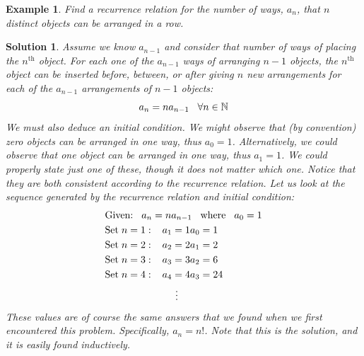 \documentclass[12pt, letterpaper, onecolumn, conference, final]{IEEEtran}
\theoremstyle{definition}
\theoremstyle{plain}
\newtheorem{example}{Example}[section]
\newtheorem{solution}{Solution}[section]
\begin{document}
\begin{example}
Find a recurrence relation for the number of ways, $a_n$, that $n$ distinct objects can be arranged in a row.
\end{example}

\newpage
\begin{solution}
Assume we know $a_{n-1}$ and consider that number of ways of placing the $n^\text{th}$ object. For each one of the $a_{n-1}$ ways of arranging $n-1$ objects, the $n^\text{th}$ object can be inserted before, between, or after giving $n$ new arrangements for each of the $a_{n-1}$ arrangements of $n-1$ objects:
\begin{equation*}
a_n = na_{n-1} \hspace{.3cm} \forall n \in \mathbb{N}
\end{equation*}
We must also deduce an initial condition. We might observe that (by convention) zero objects can be arranged in one way, thus $a_0=1$. Alternatively, we could observe that one object can be arranged in one way, thus $a_1=1$. We could properly state just one of these, though it does not matter which one. Notice that they are both consistent according to the recurrence relation. Let us look at the sequence generated by the recurrence relation and initial condition:
\begin{equation*}
\begin{split}
&\text{Given:} \hspace{.3cm} a_n = na_{n-1} \hspace{.3cm} \text{where} \hspace{.3cm} a_0 = 1 \\
&\text{Set} \hspace{.1cm} n = 1: \hspace{.3cm} a_1 = 1a_0 = 1 \\
&\text{Set} \hspace{.1cm} n = 2: \hspace{.3cm} a_2 = 2a_1 = 2 \\
&\text{Set} \hspace{.1cm} n = 3: \hspace{.3cm} a_3 = 3a_2 = 6 \\
&\text{Set} \hspace{.1cm} n = 4: \hspace{.3cm} a_4 = 4a_3 = 24 \\ 
& \hspace{2.5cm} \vdots
\end{split}
\end{equation*}
These values are of course the same answers that we found when we first encountered this problem. Specifically, $a_n=n!$. Note that this is the solution, and it is easily found inductively.
\end{solution}
\end{document}
